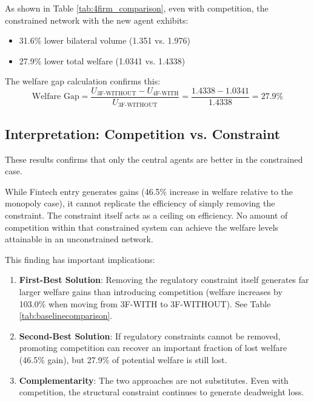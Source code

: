 As shown in Table \ref{tab:4firm_comparison}, even with competition, the constrained network with the new agent exhibits:

\begin{itemize}
    \item 31.6\% lower bilateral volume (1.351 vs. 1.976)
    \item 27.9\% lower total welfare (1.0341 vs. 1.4338)
\end{itemize}

The welfare gap calculation confirms this:
\begin{equation}
\text{Welfare Gap} = \frac{U_{\text{3F-WITHOUT}} - U_{\text{4F-WITH}}}{U_{\text{3F-WITHOUT}}} = \frac{1.4338 - 1.0341}{1.4338} = 27.9\%
\end{equation}

\subsection{Interpretation: Competition vs. Constraint}

These results confirms that only the central agents are better in the constrained case. 

While Fintech entry generates gains (46.5\% increase in welfare relative to the monopoly case), it cannot replicate the efficiency of simply removing the constraint. The constraint itself acts as a ceiling on efficiency. No amount of competition within that constrained system can achieve the welfare levels attainable in an unconstrained network.

This finding has important implications:
\begin{enumerate}
    \item \textbf{First-Best Solution}: Removing the regulatory constraint itself generates far larger welfare gains than introducing competition (welfare increases by 103.0\% when moving from 3F-WITH to 3F-WITHOUT). See Table \ref{tab:baselinecomparison}.
    
    \item \textbf{Second-Best Solution}: If regulatory constraints cannot be removed, promoting competition can recover an important fraction of lost welfare (46.5\% gain), but 27.9\% of potential welfare is still lost.
    
    \item \textbf{Complementarity}: The two approaches are not substitutes. Even with competition, the structural constraint continues to generate deadweight loss.
\end{enumerate}

